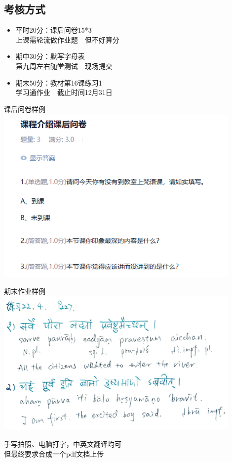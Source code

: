 \documentclass[17pt]{beamer}
\begin{document}
\subsection{考核方式}
\begin{frame}{\insertsubsection }
  \begin{itemize}
    \item
      平时20分：课后问卷15*3\\ 上课需轮流做作业题~~但不好算分
    \item
      期中30分：默写字母表\\第九周左右随堂测试~~现场提交
    \item
      期末50分：教材第16课练习1\\学习通作业~~截止时间12月31日
  \end{itemize}
\end{frame}

\begin{frame}{课后问卷样例}
    \centering    
    \includegraphics[width=0.9\textwidth]{questionnaire.png}
\end{frame}

\begin{frame}{期末作业样例}
    \centering    
    \includegraphics[width=0.9\textwidth]{homework.jpg}
    
    手写拍照、电脑打字，中英文翻译均可 \\
    但最终要求合成一个pdf文档上传
\end{frame}
\end{document}
